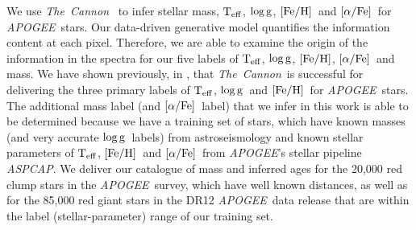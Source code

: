 \documentclass[12pt, preprint]{aastex}
\newcommand{\project}[1]{\textsl{#1}}
\newcommand{\tc}{\project{The~Cannon}}
\newcommand{\apogee}{\project{APOGEE}}
\newcommand{\aspcap}{\project{ASPCAP}}
\newcommand{\teff}{\mbox{$\rm T_{eff}$}}
\newcommand{\feh}{\mbox{$\rm [Fe/H]$}}
\newcommand{\alphafe}{\mbox{$\rm [\alpha/Fe]$}}
\newcommand{\logg}{\mbox{$\rm \log g$}}
\begin{document}
We use \tc\  \citep{Ness2015} to infer stellar mass, \teff, \logg, \feh\ and \alphafe\ for \apogee\ stars.  Our data-driven generative model quantifies the information content at each pixel. Therefore, we are able to examine the origin of the information in the spectra for our five labels of \teff, \logg, \feh, \alphafe\ and mass. We have shown previously, in  \citet{Ness2015},  that \tc\ is successful for delivering the three primary labels of \teff, \logg\ and \feh\ for \apogee\ stars. The additional mass label (and \alphafe\ label) that we infer in this work is able to be determined because we have a training set of stars, which have known masses (and very accurate \logg\ labels) from astroseismology and known stellar parameters of \teff, \feh\ and \alphafe\ from \apogee's stellar pipeline \aspcap. We deliver our catalogue of mass and inferred ages for the 20,000 red clump stars in the \apogee\ survey, which have well known distances, as well as for the 85,000 red giant stars in the DR12 \apogee\ data release that are within the label (stellar-parameter) range of our training set.







\end{document}
